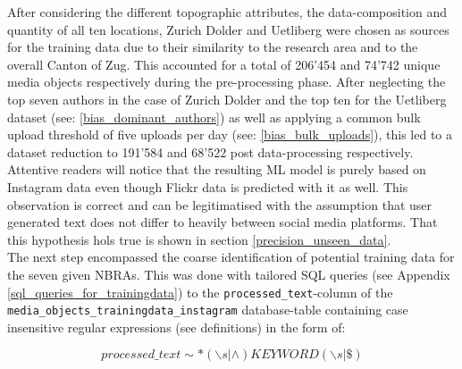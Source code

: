 After considering the different topographic attributes, the data-composition and quantity of all ten locations, Zurich Dolder and Uetliberg were chosen as sources for the training data due to their similarity to the research area and to the overall Canton of Zug. This accounted for a total of 206'454 and 74'742 unique media objects respectively during the pre-processing phase. After neglecting the top seven authors in the case of Zurich Dolder and the top ten for the Uetliberg dataset (see: \ref{bias_dominant_authors}) as well as applying a common bulk upload threshold of five uploads per day (see: \ref{bias_bulk_uploads}), this led to a dataset reduction to 191'584 and 68'522 post data-processing respectively. Attentive readers will notice that the resulting ML model is purely based on Instagram data even though Flickr data is predicted with it as well. This observation is correct and can be legitimatised with the assumption that user generated text does not differ to heavily between social media platforms. That this hypothesis hols true is shown in section \ref{precision_unseen_data}.\\
\newline
The next step encompassed the coarse identification of potential training data for the seven given NBRAs. This was done with tailored SQL queries (see Appendix \ref{sql_queries_for_trainingdata}) to the \texttt{processed\_text}-column of the \texttt{media\_objects\_trainingdata\_instagram} database-table containing case insensitive regular expressions (see definitions) in the form of:

\[processed\_text \sim * (\backslash s | \wedge)KEYWORD(\backslash s | \$)\]

